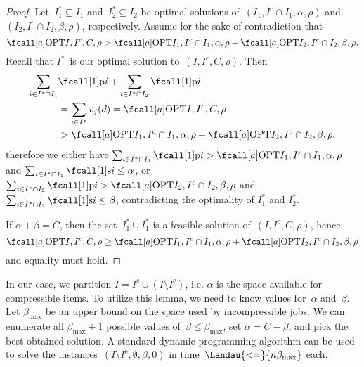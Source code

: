 \begin{proof}
  Let~$I_1^* \subseteq I_1$ and~$I_2^* \subseteq I_2$ be optimal solutions
  of~$(I_1, I^c \cap I_1, \alpha, \rho)$ and $(I_2, I^c \cap I_2, \beta, \rho)$, respectively.
  Assume for the sake of contradiction that
  \begin{equation}
    \KPCOPT{I, I^c, C, \rho} > \KPCOPT{I_1, I^c \cap I_1, \alpha, \rho} + \KPCOPT{I_2, I^c \cap I_2, \beta, \rho} \dpunct{.}
  \end{equation}
  Recall that $I^*$~is our optimal solution to~$(I, I^c, C, \rho)$.
  Then
  \begin{equation}
    \begin{aligned}
      \sum_{i \in I^* \cap I_1} & \pr{i} + \sum_{i \in I^* \cap I_2} \pr{i} \\
      &= \sum_{i \in I^*} v_j(d) = \KPCOPT{I, I^c, C, \rho} \\
      &> \KPCOPT{I_1, I^c \cap I_1, \alpha, \rho} + \KPCOPT{I_2, I^c \cap I_2, \beta, \rho} \dpunct{,}
    \end{aligned}
  \end{equation}
  therefore we either have $\sum_{i \in I^* \cap I_1} \pr{i} > \KPCOPT{I_1, I^c \cap I_1, \alpha, \rho}$
  and $\sum_{i \in I^* \cap I_1} \s{i} \leq \alpha$,
  or $\sum_{i \in I^* \cap I_2} \pr{i} > \KPCOPT{I_2, I^c \cap I_2, \beta, \rho}$
  and $\sum_{i \in I^* \cap I_2} \s{i} \leq \beta$,
  contradicting the optimality of $I_1^*$ and $I_2^*$.
  
  If $\alpha + \beta = C$,
  then the set~$I_1^* \cup I_1^*$ is a feasible solution of~$(I, I^c, C, \rho)$,
  hence
  \begin{equation}
    \KPCOPT{I, I^c, C, \rho} \geq \KPCOPT{I_1, I^c \cap I_1, \alpha, \rho} + \KPCOPT{I_2, I^c \cap I_2, \beta, \rho}
  \end{equation}
  and equality must hold.
\end{proof}

In our case, we partition $I = I^c \cup (I \setminus I^c)$,
i.e. $\alpha$ is the space available for compressible items.
To utilize this lemma, we need to know values for~$\alpha$ and~$\beta$.
Let $\beta_{\max}$ be an upper bound on the space used by incompressible jobs.
We can enumerate all $\beta_{\max} + 1$ possible values of~$\beta \leq \beta_{\max}$,
set $\alpha = C - \beta$,
and pick the best obtained solution.
A standard dynamic programming algorithm can be used to solve
the instances~$(I \setminus I^\mathrm{c}, \emptyset, \beta, 0)$
in time~$\Landau{<=}{n \beta_{\max}}$ each.

